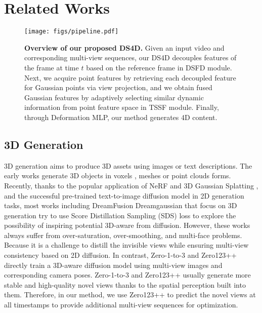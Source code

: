\section{Related Works}
\label{sec:related}

\begin{figure*}[!t]%
\centering
\texttt{[image: figs/pipeline.pdf]}
\caption{\textbf{Overview of our proposed DS4D.} Given an input video and corresponding multi-view sequences, our DS4D decouples features of the frame at time $t$ based on the reference frame in DSFD module. Next, we acquire point features by retrieving each decoupled feature for Gaussian points via view projection, and we obtain fused Gaussian features by adaptively selecting similar dynamic information from point feature space in TSSF module. Finally, through Deformation MLP, our method generates 4D content. 
}\label{pipeline}
\end{figure*}


\subsection{3D Generation}

3D generation aims to produce 3D assets using images or text descriptions. The early works generate 3D objects in voxels \cite{choy20163d,xie2020pix2vox++,zhu2023umiformer,yang2023long}, meshes \cite{wang2018pixel2mesh,niemeyer2020differentiable,wen2022pixel2mesh++} or point clouds \cite{gadelha2018multiresolution,achlioptas2018learning,luo2021diffusion} forms. Recently, thanks to the popular application of NeRF \cite{mildenhall2021nerf,muller2022instant} and 3D Gaussian Splatting \cite{kerbl20233d,yu2024mip}, and the successful pre-trained text-to-image diffusion model \cite{saharia2022photorealistic} in 2D generation tasks, most works including DreamFusion \cite{poole2023dreamfusion} Dreamgaussian \cite{tang2024dreamgaussian} that focus on 3D generation try to use Score Distillation Sampling (SDS) loss \cite{poole2023dreamfusion} to explore the possibility of inspiring potential 3D-aware from diffusion. However, these works always suffer from over-saturation, over-smoothing, and multi-face problems. Because it is a challenge to distill the invisible views while ensuring multi-view consistency based on 2D diffusion. In contrast, Zero-1-to-3 \cite{liu2023zero} and Zero123++ \cite{shi2023zero123++} directly train a 3D-aware diffusion model using multi-view images and corresponding camera poses. Zero-1-to-3 and Zero123++ usually generate more stable and high-quality novel views thanks to the spatial perception built into them. Therefore, in our method, we use Zero123++ to predict the novel views at all timestamps to provide additional multi-view sequences for optimization. 

